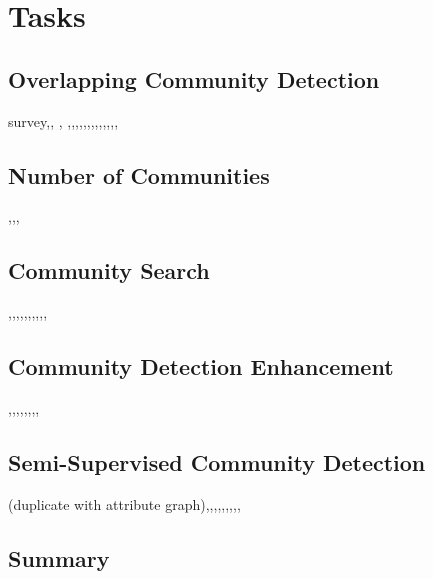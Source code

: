 \section{Tasks}
\subsection{Overlapping Community Detection}
\cite{amelio2014overlapping} survey,\cite{xie2013overlapping}, \cite{coscia2012demon}, \cite{yang2013overlapping},\cite{huang2018overlapping},\cite{zhang2015incorporating},\cite{zhang2016modeling},\cite{wang2017overlapping},\cite{jin2015combined},\cite{whang2013overlapping},\cite{yang2012community},\cite{gopalan2013efficient},\cite{jin2016detect},\cite{whang2016overlapping},\cite{eustace2015overlapping},\cite{he2015detecting},\cite{yang2017finding}

\subsection{Number of Communities}
\cite{newman2016estimating},\cite{chen2018network},\cite{saldana2017many},\cite{le2015estimating} 

\subsection{Community Search}
\cite{chen2012dense},\cite{lancichinetti2011finding},\cite{zheng2017finding},\cite{cui2014local},\cite{sozio2010community},\cite{barbieri2015efficient},\cite{huang2014querying},\cite{huang2015approximate},\cite{qin2015locally},\cite{li2015influential},\cite{wu2015robust}

\subsection{Community Detection Enhancement}
\cite{wen2011improving},\cite{he2016model},\cite{khadivi2011network},\cite{de2013enhancing},\cite{lai2010enhanced},\cite{zhou2019adversarial},\cite{li2019edmot},\cite{bhatt2019knowledge},\cite{zhang2013enhanced}


\subsection{Semi-Supervised Community Detection}
\cite{jin2019graph}(duplicate with attribute graph),\cite{yang2015unified},\cite{wang2018unified},\cite{zhang2014phase},\cite{cheng2014active},\cite{eaton2012spin},\cite{liu2017semi},\cite{ma2010semi},\cite{li2014extremal},\cite{yang2015active}


\subsection{Summary}
